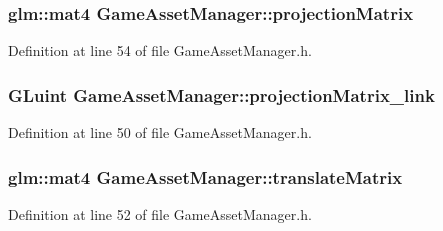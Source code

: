 \hypertarget{class_game_asset_manager_a2bc76e9ac72dcf9490436a59dc3bc752}{}
\subsubsection[{projection\+Matrix}]{\setlength{\rightskip}{0pt plus 5cm}glm\+::mat4 Game\+Asset\+Manager\+::projection\+Matrix\hspace{0.3cm}{\ttfamily [private]}}\label{class_game_asset_manager_a2bc76e9ac72dcf9490436a59dc3bc752}


Definition at line 54 of file Game\+Asset\+Manager.\+h.

\hypertarget{class_game_asset_manager_aa98eb0fb89a0a39e29be33294b322855}{}
\subsubsection[{projection\+Matrix\+\_\+link}]{\setlength{\rightskip}{0pt plus 5cm}G\+Luint Game\+Asset\+Manager\+::projection\+Matrix\+\_\+link\hspace{0.3cm}{\ttfamily [private]}}\label{class_game_asset_manager_aa98eb0fb89a0a39e29be33294b322855}


Definition at line 50 of file Game\+Asset\+Manager.\+h.

\hypertarget{class_game_asset_manager_a1f0530749ec3ca5ee7925b2b70e8a8c2}{}
\subsubsection[{translate\+Matrix}]{\setlength{\rightskip}{0pt plus 5cm}glm\+::mat4 Game\+Asset\+Manager\+::translate\+Matrix\hspace{0.3cm}{\ttfamily [private]}}\label{class_game_asset_manager_a1f0530749ec3ca5ee7925b2b70e8a8c2}


Definition at line 52 of file Game\+Asset\+Manager.\+h.

\hypertarget{class_game_asset_manager_a5e737710573e276ca53c683bc6731a51}{}
